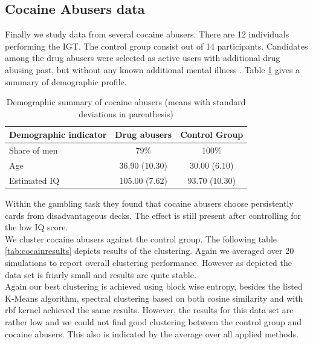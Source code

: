 \documentclass[12pt,a4paper,bibliography=totocnumbered,listof=totocnumbered]{scrartcl}
\begin{document}
{\subsection{Cocaine Abusers data}

Finally we study data from several cocaine abusers. There are 12 individuals performing the IGT. The control group consist out of 14 participants. Candidates among the drug abusers were selected as active users with additional drug abusing past, but without any known additional mental illness \cite{Stout2004}. Table \ref{tab:cocs} gives a summary of demographic profile.

\setlength{\tabcolsep}{12pt}
\renewcommand{\arraystretch}{1}
\begin{table}[H]
	\centering 
		\caption{Demographic summary of cocaine abusers (means with standard deviations in parenthesis)}
	\begin{tabular}{lcc}
		\toprule
		\textbf{Demographic indicator} & \textbf{Drug abusers} & \textbf{Control Group} \\
		\hline
		Share of men &  79\% & 100\%\\
		Age & 36.90 (10.30) & 30.00 (6.10) \\
		Estimated IQ & 105.00 (7.62) & 93.70 (10.30) \\
		\bottomrule
	\end{tabular}
	\label{tab:cocs}
\end{table}




Within the gambling task they found that cocaine abusers choose persistently cards from disadvantageous decks. The effect is still present after controlling for the low IQ score.\\
We cluster cocaine abusers against the control group. The following table \ref{tab:cocainresults} depicts results of the clustering. Again we averaged over 20 simulations to report overall clustering performance. However as depicted the data set is friarly small and results are quite stable.\\
Again our best clustering is achieved using block wise entropy, besides the listed K-Means algorithm, spectral clustering based on both cosine similarity and with rbf kernel achieved the same results. However, the results for this data set are rather low and we could not find  good clustering between the control group and cocaine abusers. This also is indicated by the average over all applied methods. 

}
\end{document}
